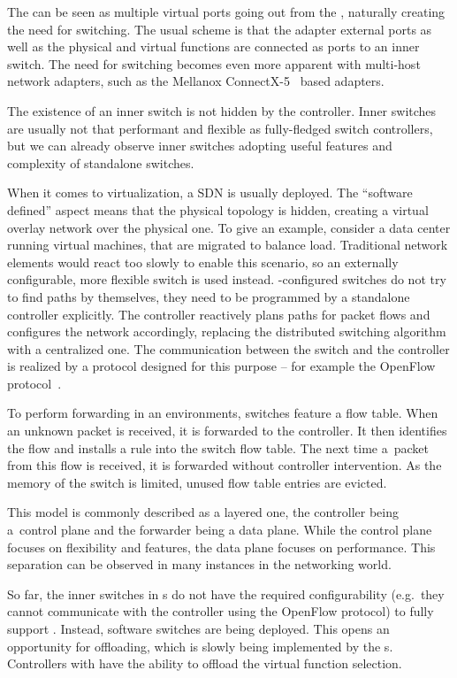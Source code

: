 The  can be seen as multiple virtual
ports going out from the , naturally creating the need for switching.
The usual scheme is that the adapter external ports as well as the physical and
virtual functions are connected as ports to an inner switch. The need for
switching becomes even more apparent with multi-host network adapters, such
as the Mellanox ConnectX-5~\cite{mlx5-pb} based adapters.

The existence of an inner switch is not hidden by the controller. Inner switches
are usually not that performant and flexible as fully-fledged switch controllers,
but we can already observe inner switches adopting useful features and
complexity of standalone switches.

When it comes to virtualization, a \acrfull{SDN} is usually
deployed. The ``software defined'' aspect means that the physical topology is
hidden, creating a virtual overlay network over the physical one.
To give an example, consider a data center running virtual machines, that are
migrated to balance load. Traditional network elements would react too
slowly to enable this scenario, so an externally configurable, more flexible
switch is used instead. -configured switches do not try to find paths by
themselves, they need to be programmed by a standalone  controller
explicitly. The controller reactively plans paths for packet flows and
configures the network accordingly, replacing the distributed switching
algorithm with a centralized one. The
communication between the switch and the controller is realized by a protocol
designed for this purpose -- for example the OpenFlow protocol~\cite{openflow}.

To perform forwarding in an  environments, switches feature a flow table. When
an unknown packet is received, it is forwarded to the controller. It then
identifies the flow and installs a rule into the switch flow table. The next time
a~packet from this flow is received, it is forwarded without controller
intervention. As the memory of the switch is limited, unused flow table entries
are evicted.

This model is commonly described as a layered one, the controller being
a~control plane and the forwarder being a data plane. While the control plane
focuses on flexibility and features, the data plane focuses on performance. This
separation can be observed in many instances in the networking world.

So far, the inner switches in s do not have the required configurability
(e.g.\ they cannot communicate with the controller using the OpenFlow protocol)
to fully support . Instead, software switches are being deployed. This
opens an opportunity for offloading, which is slowly being implemented by the
s. Controllers with  have the ability to offload the virtual
function selection.

